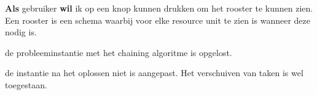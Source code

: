 \nextUserStory
\textbf{Als} gebruiker \textbf{wil} ik op een knop kunnen drukken om het rooster te kunnen zien. Een rooster is een schema waarbij voor elke resource unit te zien is wanneer deze nodig is. 
\beginGegeven
    \item de probleeminstantie met het chaining algoritme is opgelost.
    \item de instantie na het oplossen niet is aangepast. Het verschuiven van taken is wel toegestaan. 
\endGegeven
